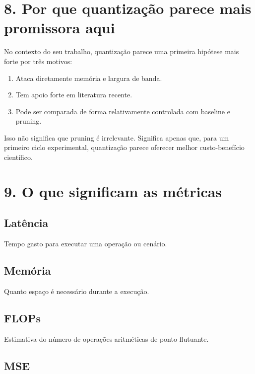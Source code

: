 \section{8. Por que quantização parece mais promissora aqui}



No contexto do seu trabalho, quantização parece uma primeira hipótese mais forte por três motivos:


\begin{enumerate}
\item Ataca diretamente memória e largura de banda.
\item Tem apoio forte em literatura recente.
\item Pode ser comparada de forma relativamente controlada com baseline e pruning.
\end{enumerate}



Isso não significa que pruning é irrelevante. Significa apenas que, para um primeiro ciclo experimental, quantização parece oferecer melhor custo-benefício científico.



\section{9. O que significam as métricas}



\subsection{Latência}


Tempo gasto para executar uma operação ou cenário.



\subsection{Memória}


Quanto espaço é necessário durante a execução.



\subsection{FLOPs}


Estimativa do número de operações aritméticas de ponto flutuante.



\subsection{MSE}


